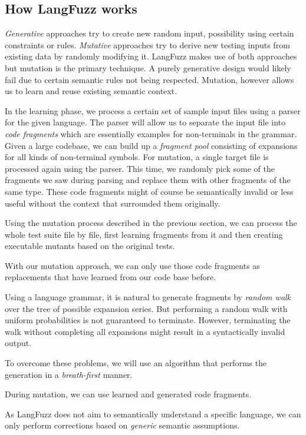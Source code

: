 \subsection{How LangFuzz works}
\textit{Generative} approaches try to create new random input, possibility using certain constraints or rules.
\textit{Mutative} approaches try to derive new testing inputs from existing data by randomly modifying it. 
LangFuzz makes use of both approaches but mutation is the primary technique. A purely generative design would likely fail due to certain semantic rules not being respected.
Mutation, however allows us to learn and reuse existing semantic context.

In the learning phase, we process a certain set of sample input files using a parser for the given language.
The parser will allow us to separate the input file into \textit{code fragments} which are essentially examples for non-terminals in the grammar.
Given a large codebase, we can build up a \textit{fragment pool} consisting of expansions for all kinds of non-terminal symbols.
For mutation, a single target file is processed again using the parser. This time, we randomly pick some of the fragments we saw during parsing and replace them with other fragments of the same type.
These code fragments might of course be semantically invalid or less useful without the context that surrounded them originally.

Using the mutation process described in the previous section, we can process the whole test suite file by file, first learning fragments from it and then creating executable mutants based on the original tests.

With our mutation approach, we can only use those code fragments as replacements that have learned from our code base before.

Using a language grammar, it is natural to generate fragments by \textit{random walk} over the tree of possible expansion series. But performing a random walk with uniform probabilities is not guaranteed to terminate. However, terminating the walk without completing all expansions might result in a syntactically invalid output.

To overcome these problems, we will use an algorithm that performs the generation in a \textit{breath-first} manner.

During mutation, we can use learned and generated code fragments.

As LangFuzz does not aim to semantically understand a specific language, we can only perform corrections based on \textit{generic} semantic assumptions.

